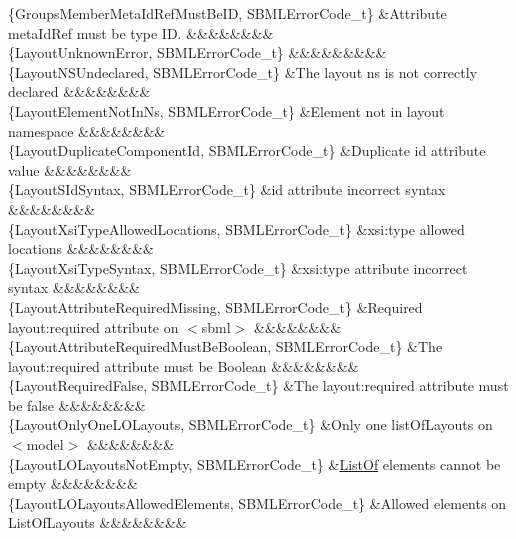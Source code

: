 \begin{DoxyParagraph}{}
\begin{longtabu}
\{Groups\+Member\+Meta\+Id\+Ref\+Must\+Be\+ID, S\+B\+M\+L\+Error\+Code\+\_\+t\} &Attribute \textquotesingle{}meta\+Id\+Ref\textquotesingle{} must be type \textquotesingle{}ID\textquotesingle{}. &&&&&&&&\\
\{Layout\+Unknown\+Error, S\+B\+M\+L\+Error\+Code\+\_\+t\} &&&&&&&&&\\
\{Layout\+N\+S\+Undeclared, S\+B\+M\+L\+Error\+Code\+\_\+t\} &The layout ns is not correctly declared &&&&&&&&\\
\{Layout\+Element\+Not\+In\+Ns, S\+B\+M\+L\+Error\+Code\+\_\+t\} &Element not in layout namespace &&&&&&&&\\
\{Layout\+Duplicate\+Component\+Id, S\+B\+M\+L\+Error\+Code\+\_\+t\} &Duplicate \textquotesingle{}id\textquotesingle{} attribute value &&&&&&&&\\
\{Layout\+S\+Id\+Syntax, S\+B\+M\+L\+Error\+Code\+\_\+t\} &\textquotesingle{}id\textquotesingle{} attribute incorrect syntax &&&&&&&&\\
\{Layout\+Xsi\+Type\+Allowed\+Locations, S\+B\+M\+L\+Error\+Code\+\_\+t\} &\textquotesingle{}xsi\+:type\textquotesingle{} allowed locations &&&&&&&&\\
\{Layout\+Xsi\+Type\+Syntax, S\+B\+M\+L\+Error\+Code\+\_\+t\} &\textquotesingle{}xsi\+:type\textquotesingle{} attribute incorrect syntax &&&&&&&&\\
\{Layout\+Attribute\+Required\+Missing, S\+B\+M\+L\+Error\+Code\+\_\+t\} &Required layout\+:required attribute on {\ttfamily $<$sbml$>$} &&&&&&&&\\
\{Layout\+Attribute\+Required\+Must\+Be\+Boolean, S\+B\+M\+L\+Error\+Code\+\_\+t\} &The layout\+:required attribute must be Boolean &&&&&&&&\\
\{Layout\+Required\+False, S\+B\+M\+L\+Error\+Code\+\_\+t\} &The layout\+:required attribute must be \textquotesingle{}false\textquotesingle{} &&&&&&&&\\
\{Layout\+Only\+One\+L\+O\+Layouts, S\+B\+M\+L\+Error\+Code\+\_\+t\} &Only one list\+Of\+Layouts on {\ttfamily $<$model$>$} &&&&&&&&\\
\{Layout\+L\+O\+Layouts\+Not\+Empty, S\+B\+M\+L\+Error\+Code\+\_\+t\} &\hyperlink{class_list_of}{List\+Of} elements cannot be empty &&&&&&&&\\
\{Layout\+L\+O\+Layouts\+Allowed\+Elements, S\+B\+M\+L\+Error\+Code\+\_\+t\} &Allowed elements on List\+Of\+Layouts &&&&&&&&\\

\end{longtabu}
\end{DoxyParagraph}
